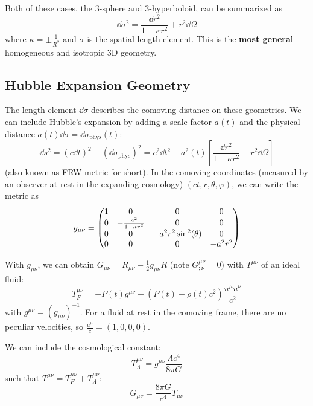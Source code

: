 \documentclass[a4paper,twoside,master.tex]{subfiles}
\begin{document}
Both of these cases, the 3-sphere and 3-hyperboloid, can be summarized as
\begin{equation}
    \dd{\sigma}^2 = \frac{\dd{r}^2}{1 - \kappa r^2} + r^2 \dd{\Omega}
\end{equation}
where $ \kappa = \pm \frac{1}{R^2} $ and $ \sigma $ is the spatial length element. This is the \textbf{most general} homogeneous and isotropic 3D geometry.

\subsection{Hubble Expansion Geometry}\label{sub:hubble_expansion_geometry}

The length element $ \dd{\sigma} $ describes the comoving distance on these geometries. We can include Hubble's expansion by adding a scale factor $ a(t) $ and the physical distance $ a(t) \dd{\sigma} = \dd{\sigma_{\text{phys}}(t)} $:
\begin{equation}
    \dd{s}^2 = (c \dd{t})^2 - (\dd{\sigma_{\text{phys}}})^2 = c^2 \dd{t}^2 - a^2(t) \left[ \frac{\dd{r}^2}{1 - \kappa r^2} + r^2 \dd{\Omega} \right] \tag{Friedmann-Robertson-Walker Metric}
\end{equation}
(also known as FRW metric for short). In the comoving coordinates (measured by an observer at rest in the expanding cosmology) $ (ct, r, \theta, \varphi) $, we can write the metric as
\begin{equation}
    g_{\mu \nu} = \mqty(\dmat[0]{1,- \frac{a^2}{1 - \kappa r^2}, - a^2 r^2 \sin[2](\theta), -a^2 r^2})
\end{equation}

With $ g_{\mu \nu} $, we can obtain $ G_{\mu \nu} = R_{\mu \nu} - \frac{1}{2} g_{\mu \nu} R $ (note $ G^{\mu \nu}_{; \nu} = 0 $) with $ T^{\mu \nu} $ of an ideal fluid:
\begin{equation}
    T^{\mu \nu}_{F} = - P(t) g^{\mu \nu} + (P(t) + \rho(t) c^2) \frac{u^{\mu} u^{\nu}}{c^2}
\end{equation}
with $ g^{\mu \nu} = (g_{\mu \nu})^{-1} $. For a fluid at rest in the comoving frame, there are no peculiar velocities, so $ \frac{u^{\mu}}{c} = (1, 0, 0, 0) $.

We can include the cosmological constant:
\begin{equation}
    T^{\mu \nu}_{\Lambda} = g^{\mu \nu} \frac{\Lambda c^4}{8 \pi G}
\end{equation}
such that $ T^{\mu \nu} = T^{\mu \nu}_F + T^{\mu \nu}_{\Lambda} $:
\begin{equation}
    G_{\mu \nu} = \frac{8 \pi G}{c^4} T_{\mu \nu}
\end{equation}
\end{document}
